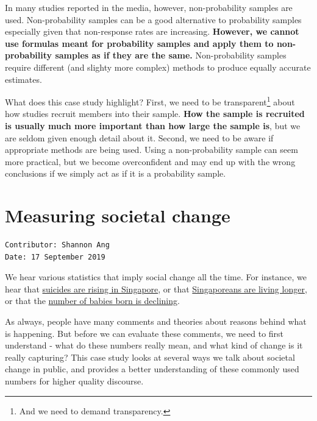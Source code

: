 \documentclass[openany]{book}
\let\rmarkdownfootnote\footnote%
\def\footnote{\protect\rmarkdownfootnote}
\begin{document}
In many studies reported in the media, however, non-probability samples
are used. Non-probability samples can be a good alternative to
probability samples especially given that non-response rates are
increasing. \textbf{However, we cannot use formulas meant for
probability samples and apply them to non-probability samples as if they
are the same.} Non-probability samples require different (and slighty
more complex) methods to produce equally accurate estimates.

What does this case study highlight? First, we need to be
transparent\footnote{And we need to demand transparency.} about how
studies recruit members into their sample. \textbf{How the sample is
recruited is usually much more important than how large the sample is},
but we are seldom given enough detail about it. Second, we need to be
aware if appropriate methods are being used. Using a non-probability
sample can seem more practical, but we become overconfident and may end
up with the wrong conclusions if we simply act as if it is a probability
sample.

\chapter{Measuring societal change}\label{apc}

\begin{verbatim}
Contributor: Shannon Ang
Date: 17 September 2019
\end{verbatim}

We hear various statistics that imply social change all the time. For
instance, we hear that
\href{https://www.channelnewsasia.com/news/singapore/suicides-number-2018-teenagers-boys-highest-11761480}{suicides
are rising in Singapore}, or that
\href{https://www.todayonline.com/singapore/singaporeans-living-longer-spending-greater-proportion-time-ill-health-study}{Singaporeans
are living longer}, or that the
\href{https://www.channelnewsasia.com/news/singapore/number-of-babies-born-in-singapore-falls-to-lowest-in-8-years-11743722}{number
of babies born is declining}.

As always, people have many comments and theories about reasons behind
what is happening. But before we can evaluate these comments, we need to
first understand - what do these numbers really mean, and what kind of
change is it really capturing? This case study looks at several ways we
talk about societal change in public, and provides a better
understanding of these commonly used numbers for higher quality
discourse.
\end{document}
